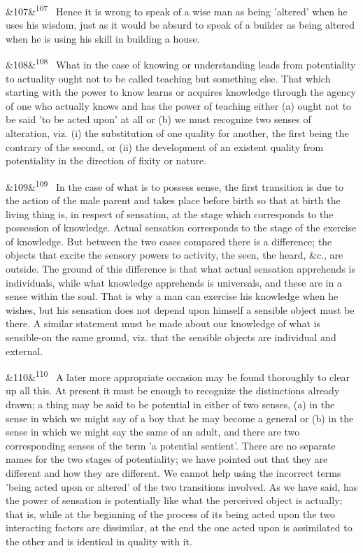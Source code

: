 \documentclass[12pt]{article}
\newcommand{\para}[1][]{\par\noindent\ifx&#1&\else\textsuperscript{\footnotesize #1}~\fi}
\begin{document}
\para[107] Hence it is wrong to speak of a wise man as being 'altered' when he uses his wisdom, just as it would be absurd to speak of a builder as being altered when he is using his skill in building a house.

\para[108] What in the case of knowing or understanding leads from potentiality to actuality ought not to be called teaching but something else. That which starting with the power to know learns or acquires knowledge through the agency of one who actually knows and has the power of teaching either (a) ought not to be said 'to be acted upon' at all or (b) we must recognize two senses of alteration, viz. (i) the substitution of one quality for another, the first being the contrary of the second, or (ii) the development of an existent quality from potentiality in the direction of fixity or nature.

\para[109] In the case of what is to possess sense, the first transition is due to the action of the male parent and takes place before birth so that at birth the living thing is, in respect of sensation, at the stage which corresponds to the possession of knowledge. Actual sensation corresponds to the stage of the exercise of knowledge. But between the two cases compared there is a difference; the objects that excite the sensory powers to activity, the seen, the heard, \&c., are outside. The ground of this difference is that what actual sensation apprehends is individuals, while what knowledge apprehends is universals, and these are in a sense within the soul. That is why a man can exercise his knowledge when he wishes, but his sensation does not depend upon himself a sensible object must be there. A similar statement must be made about our knowledge of what is sensible-on the same ground, viz. that the sensible objects are individual and external.

\para[110] A later more appropriate occasion may be found thoroughly to clear up all this. At present it must be enough to recognize the distinctions already drawn; a thing may be said to be potential in either of two senses, (a) in the sense in which we might say of a boy that he may become a general or (b) in the sense in which we might say the same of an adult, and there are two corresponding senses of the term 'a potential sentient'. There are no separate names for the two stages of potentiality; we have pointed out that they are different and how they are different. We cannot help using the incorrect terms 'being acted upon or altered' of the two transitions involved. As we have said, has the power of sensation is potentially like what the perceived object is actually; that is, while at the beginning of the process of its being acted upon the two interacting factors are dissimilar, at the end the one acted upon is assimilated to the other and is identical in quality with it.
\end{document}
